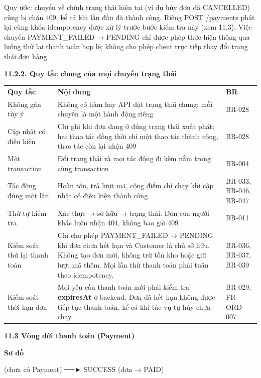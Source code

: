 \documentclass[11pt,a4paper,oneside]{report}
\begin{document}
Quy ước: chuyển về chính trạng thái hiện tại (ví dụ hủy đơn đã CANCELLED) cũng bị chặn 409, kể cả khi lần đầu đã thành công. Riêng POST /payments phát lại cùng khóa idempotency được xử lý trước bước kiểm tra này (xem 11.3). Việc chuyển PAYMENT\_FAILED → PENDING chỉ được phép thực hiện thông qua luồng thử lại thanh toán hợp lệ; không cho phép client trực tiếp thay đổi trạng thái đơn hàng.

\textbf{11.2.2. Quy tắc chung của mọi chuyển trạng thái}

\begin{longtable}[]{@{}
  >{\raggedright\arraybackslash}p{}
  >{\raggedright\arraybackslash}p{}
  >{\raggedright\arraybackslash}p{}@{}}
\toprule\noalign{}
\endhead
\bottomrule\noalign{}
\endlastfoot
\textbf{Quy tắc} & \textbf{Nội dung} & \textbf{BR} \\
Không gán tùy ý & Không có hàm hay API đặt trạng thái chung; mỗi chuyển là một hành động riêng & BR-028 \\
Cập nhật có điều kiện & Chỉ ghi khi đơn đang ở đúng trạng thái xuất phát; hai thao tác đồng thời chỉ một thao tác thành công, thao tác còn lại nhận 409 & BR-028 \\
Một transaction & Đổi trạng thái và mọi tác động đi kèm nằm trong cùng transaction & BR-004 \\
Tác động đúng một lần & Hoàn tồn, trả lượt mã, cộng điểm chỉ chạy khi cập nhật có điều kiện thành công & BR-033, BR-046, BR-047 \\
Thứ tự kiểm tra & Xác thực → sở hữu → trạng thái. Đơn của người khác luôn nhận 404, không bao giờ 409 & BR-011 \\
Kiểm soát thử lại thanh toán & Chỉ cho phép PAYMENT\_FAILED → PENDING khi đơn chưa hết hạn và Customer là chủ sở hữu. Không tạo đơn mới, không trừ tồn kho hoặc giữ lượt mã thêm. Mọi lần thử thanh toán phải tuân theo idempotency. & BR-036, BR-037, BR-039 \\
Kiểm soát thời hạn đơn & Mọi yêu cầu thanh toán mới phải kiểm tra \textbf{expiresAt} ở backend. Đơn đã hết hạn không được tiếp tục thanh toán, kể cả khi tác vụ tự hủy chưa chạy. & BR-029, FR-ORD-007 \\
\end{longtable}

\textbf{11.3 Vòng đời thanh toán (Payment)}

\textbf{Sơ đồ}

(chưa có Payment) ──► SUCCESS (đơn → PAID)
\end{document}
